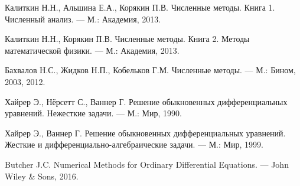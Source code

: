 \documentclass[12pt,a4paper]{article}
\begin{document}
	
	
	\newpage
	\begin{thebibliography}{99}
		
		Калиткин Н.Н., Альшина Е.А., Корякин П.В. 
		Численные методы. Книга 1. Численный анализ. --- М.: Академия, 2013. 
		
		Калиткин Н.Н., Корякин П.В. 
		Численные методы. Книга 2. Методы математической физики. --- М.: Академия, 2013. 
		
		Бахвалов Н.С., Жидков Н.П., Кобельков Г.М. 
		Численные методы. --- М.: Бином, 2003, 2012.
		
		Хайрер Э., Нёрсетт С., Ваннер Г. 
		Решение обыкновенных дифференциальных уравнений. 
		Нежесткие задачи. --- М.: Мир, 1990.
		
		Хайрер Э., Ваннер Г. 
		Решение обыкновенных дифференциальных уравнений. 
		Жесткие и дифференциально-алгебраические задачи. --- М.: Мир, 1999.
		
		Butcher J.C. Numerical Methods for Ordinary Differential Equations. --- 
		John Wiley \& Sons, 2016.
		
	\end{thebibliography}
\end{document}
